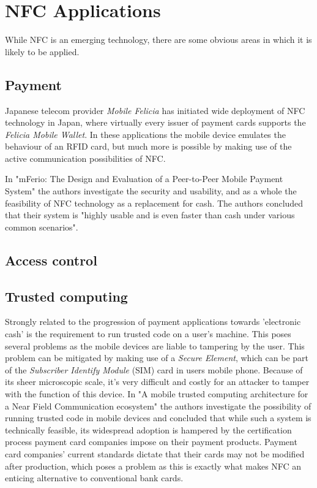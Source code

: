 \chapter{NFC Applications}
\label{chap:applications}

While NFC is an emerging technology, there are some obvious areas in which it is likely to be applied.

\section{Payment}
Japanese telecom provider \textit{Mobile Felicia} has initiated wide deployment of NFC technology in Japan, where virtually every issuer of payment cards supports the \textit{Felicia Mobile Wallet}.
In these applications the mobile device emulates the behaviour of an RFID card, but much more is possible by making use of the active communication possibilities of NFC.

In "mFerio: The Design and Evaluation of a Peer-to-Peer Mobile Payment System" the authors investigate the security and usability, and as a whole the feasibility of NFC technology as a replacement for cash.
The authors concluded that their system is "highly usable and is even faster than cash under various common scenarios".


\section{Access control}


\section{Trusted computing}
Strongly related to the progression of payment applications towards 'electronic cash' is the requirement to run trusted code on a user's machine.
This poses several problems as the mobile devices are liable to tampering by the user.
This problem can be mitigated by making use of a \textit{Secure Element}, which can be part of the \textit{Subscriber Identify Module} (SIM) card in users mobile phone.
Because of its sheer microscopic scale, it's very difficult and costly for an attacker to tamper with the function of this device.
In "A mobile trusted computing architecture for a Near Field Communication ecosystem" the authors investigate the possibility of running trusted code in mobile devices and concluded that while such a system is technically feasible, its widespread adoption is hampered by the certification process payment card companies impose on their payment products.
Payment card companies' current standards dictate that their cards may not be modified after production, which poses a problem as this is exactly what makes NFC an enticing alternative to conventional bank cards.

